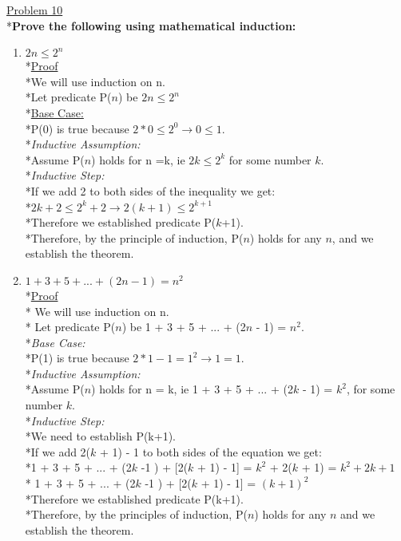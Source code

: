 \documentclass[12pt]{article}
\begin{document}
\noindent
\uline{Problem 10}
\\*\textbf{Prove the following using mathematical induction:}
\begin{enumerate}
	\item \textbf{$2n \leq 2^n$}
	\medskip
	\\*\uline{Proof}
	\medskip
	\\*We will use induction on n.
	\bigskip
	\\*Let predicate P($n$) be $2n \leq 2^n$
	\bigskip
	\\*\uline{Base Case: }
	\\*P(0) is true because $2*0 \leq 2^0 \rightarrow 0 \leq 1$.
	\bigskip
	\\*\textit{Inductive Assumption:}
	\\*Assume P($n$) holds for n =k, ie $2k \leq 2^k$ for some number $k$.
	\\*\textit{Inductive Step:}
	\\*If we add 2 to both sides of the inequality we get:
	\\*$2k + 2 \leq 2^k + 2 \rightarrow 2(k+1) \leq 2^{k+1}$
	\\*Therefore we established predicate P($k$+1).
	\bigskip
	\\*Therefore, by the principle of induction, P($n$) holds for any $n$, and we establish the theorem. 
	\bigskip
	
	
	
	\item \textbf{$1+3+5+...+(2n-1)=n^2$}
	\medskip
	\\*\uline{Proof}
	\medskip
	\\* We will use induction on n.
	\bigskip
	\\* Let predicate P($n$) be 1 + 3 + 5 + ... + (2$n$ - 1) = $n^2$.
	\bigskip
	\\*\textit{Base Case:}
	\\*P(1) is true because $2*1 - 1 = 1^2 \rightarrow 1 = 1$.
	\bigskip
	\\*\textit{Inductive Assumption:}
	\\*Assume P($n$) holds for n = k, ie 1 + 3 + 5 + ... + (2$k$ - 1) = $k^2$, for some number $k$.
	\\*\textit{Inductive Step:}
	\\*We need to establish P(k+1).
	\\*If we add 2($k$ + 1) - 1 to both sides of the equation we get:
	\\*1 + 3 + 5 + ... + (2$k$ -1 ) + [2($k$ + 1) - 1] = $k^2$ + 2($k$ + 1) = $k^2 + 2k + 1$
	\\* 1 + 3 + 5 + ... + (2$k$ -1 ) + [2($k$ + 1) - 1] = $(k + 1)^2$
	\\*Therefore we established predicate P(k+1).
	\bigskip
	\\*Therefore, by the principles of induction, P($n$) holds for any $n$ and we establish the theorem. 
	

\end{enumerate}
\end{document}
